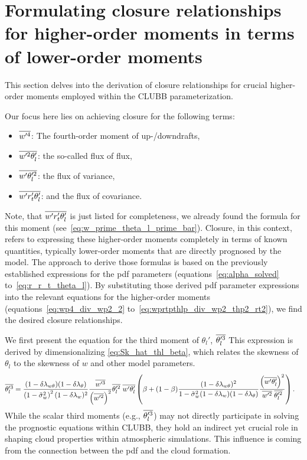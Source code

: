\section{Formulating closure relationships for higher-order moments in terms of lower-order moments}
\label{sec:formulating-closure-relationships-for-higher-order-moments-in-terms-of-lower-order-moments}

This section delves into the derivation of closure relationships for crucial higher-order moments
employed within the \gls{CLUBB} parameterization.

Our focus here lies on achieving closure for the following terms:
\begin{itemize}
    \item $\overline{w'^4}$: The fourth-order moment of up-/downdrafts,
    \item $\overline{w'^2 \theta_l'}$: the so-called flux of flux,
    \item $\overline{w' \theta_l'^2}$: the flux of variance,
    \item $\overline{w' r_t' \theta_l'}$: and the flux of covariance.
\end{itemize}
Note, that $\overline{w' r_t' \theta_l'}$ is just listed for completeness,
we already found the formula for this moment (see~\cref{eq:w_prime_theta_l_prime_bar}).
Closure, in this context,
refers to expressing these higher-order moments completely in terms of known quantities,
typically lower-order moments that are directly prognosed by the model.
The approach to derive those formulas is based on
the previously established expressions for the \gls{pdf} parameters (equations~\eqref{eq:alpha_solved} to~\eqref{eq:r_r_t_theta_l}).
By substituting those derived \gls{pdf} parameter expressions
into the relevant equations for the higher-order moments (equations~\eqref{eq:wp4_div_wp2_2} to~\eqref{eq:wprtpthlp_div_wp2_thp2_rt2}),
we find the desired closure relationships.

We first present the equation for the third moment of $\theta_l'$, $\overline{\theta_l'^3}$
This expression is derived by dimensionalizing \cref{eq:Sk_hat_thl_beta},
which relates the skewness of $\theta_l$ to the skewness of $w$ and other model parameters.
\begin{align}
    \label{eq:thlp3_beta}
    \overline{\theta_l'^3}
    &= \frac{(1-\delta \lambda_{w \theta})(1-\delta \lambda_\theta)}{\left( 1 - \tilde{\sigma}_w^2 \right)^2 (1-\delta \lambda_w)^2}
    \frac{\overline{w'^3}}{\left( \overline{w'^2} \right)^2}
    \overline{\theta_l'^2} \;
    \overline{w' \theta_l'}
    \left(\beta + (1-\beta)
    \frac{(1-\delta \lambda_{w \theta})^2}{1-{\tilde{\sigma}_w}^2 (1-\delta \lambda_w)(1-\delta \lambda_\theta)}
    \frac{\left(\overline{w' \theta_l'}\right)^2}{\overline{w'^2} \; \overline{\theta_l'^2}}\right).
\end{align}
While the scalar third moments (e.g., $\overline{\theta_l'^3}$) may not directly participate
in solving the prognostic equations within \gls{CLUBB},
they hold an indirect yet crucial role in shaping cloud properties within atmospheric simulations.
This influence is coming from the connection between the \gls{pdf} and the cloud formation.

